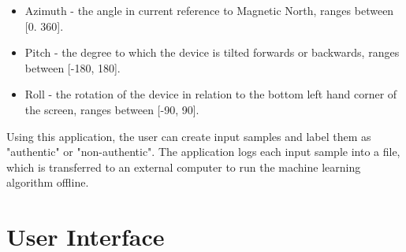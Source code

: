 \documentclass[12pt]{article}
\begin{document}
\begin{itemize}
\item Azimuth - the angle in current reference to Magnetic North, ranges between [0. 360]. 
\item Pitch - the degree to which the device is tilted forwards or backwards, ranges between [-180, 180].
\item Roll - the rotation of the device in relation to the bottom left hand corner of the screen, ranges between [-90, 90].
\end{itemize}

Using this application, the user can create input samples and label them as "authentic" or "non-authentic". The application logs each input sample into a file, which is transferred to an external computer to run the machine learning algorithm offline.

\section{User Interface}
\end{document}
